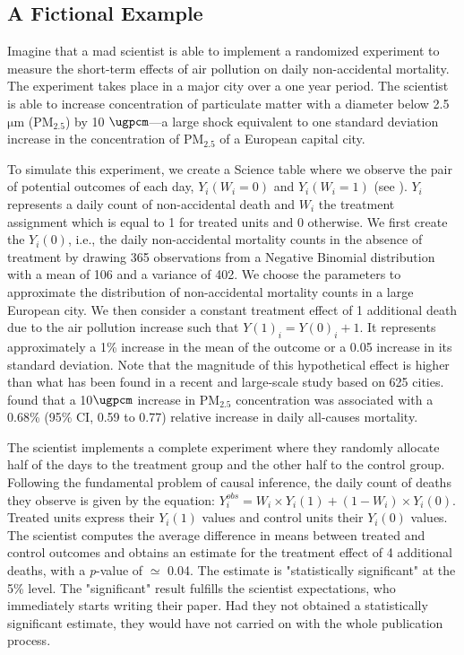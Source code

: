 \documentclass[12pt]{article}
\begin{document}
    \subsection{A Fictional Example}

    Imagine that a mad scientist is able to implement a randomized experiment to measure the short-term effects of air pollution on daily non-accidental mortality. The experiment takes place in a major city over a one year period. The scientist is able to increase concentration of particulate matter with a diameter below 2.5 $\si{\um}$ (PM$_{2.5}$) by 10 $\si{\ugpcm}$---a large shock equivalent to one standard deviation increase in the concentration of PM$_{2.5}$ of a European capital city.
    
        

    To simulate this experiment, we create a Science table \citep{rubin1974estimating} where we observe the pair of potential outcomes of each day, $Y_{i}(W_{i}=0)$ and $Y_{i}(W_{i}=1)$ (see ). $Y_{i}$ represents a daily count of non-accidental death and $W_{i}$ the treatment assignment which is equal to 1 for treated units and 0 otherwise. We first create the $Y_{i}(0)$, i.e., the daily non-accidental mortality counts in the absence of treatment by drawing 365 observations from a Negative Binomial distribution with a mean of 106 and a variance of 402. We choose the parameters to approximate the distribution of non-accidental mortality counts in a large European city. We then consider a constant treatment effect of 1 additional death due to the air pollution increase such that $Y(1)_{i} = Y(0)_{i} + 1$. It represents approximately a 1\% increase in the mean of the outcome or a 0.05 increase in its standard deviation. Note that the magnitude of this hypothetical effect is higher than what has been found in a recent and large-scale study based on 625 cities. \cite{liu_ambient_2019} found that a 10$\si{\ugpcm}$ increase in $\text{PM}_{2.5}$ concentration was associated with a 0.68\% (95\% CI, 0.59 to 0.77) relative increase in daily all-causes mortality. 
    
    The scientist implements a complete experiment where they randomly allocate half of the days to the treatment group and the other half to the control group. Following the fundamental problem of causal inference, the daily count of deaths they observe is given by the equation: $Y_{i}^{obs} = W_{i} \times Y_{i}(1) + (1-W_{i})\times Y_{i}(0)$. Treated units express their $Y_{i}(1)$ values and control units their $Y_{i}(0)$ values. The scientist computes the average difference in means between treated and control outcomes and obtains an estimate for the treatment effect of 4 additional deaths, with a \textit{p}-value of $\simeq$ 0.04. The estimate is "statistically significant" at the 5\% level. The "significant" result fulfills the scientist expectations, who immediately starts writing their paper. Had they not obtained a statistically significant estimate, they would have not carried on with the whole publication process.
        
\end{document}
